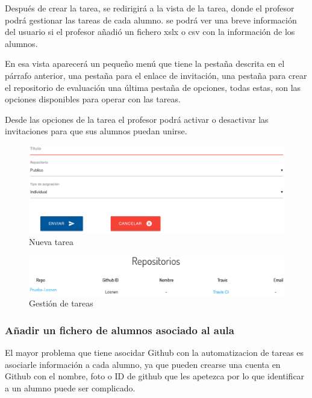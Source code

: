Después de crear la tarea, se redirigirá a la vista de la tarea, donde el profesor podrá gestionar las tareas de cada alumno. se podrá ver una breve información del usuario si el profesor añadió un fichero xslx o csv con la información de los alumnos.

En esa vista aparecerá un pequeño menú que tiene la pestaña descrita en el párrafo anterior, una pestaña para el enlace de invitación, una pestaña para crear el repositorio de evaluación una última pestaña de opciones, todas estas, son las opciones disponibles para operar con las tareas.

Desde las opciones de la tarea el profesor podrá activar o desactivar las invitaciones para que sus alumnos puedan unirse.

\begin{figure}[!th]
\begin{center}
\includegraphics[scale=0.5]{images/tarea}
\caption{Nueva tarea}
\label{fig:Nueva tarea}
\end{center}
\end{figure}

\begin{figure}[!th]
\begin{center}
\includegraphics[scale=0.5]{images/gestion}
\caption{Gestión de tareas}
\label{fig:Gestion de tareas}
\end{center}
\end{figure}

\newpage

\subsubsection{Añadir un fichero de alumnos asociado al aula}

El mayor problema que tiene asocidar Github con la automatizacion de tareas es asociarle información a cada alumno, ya que pueden crearse una cuenta en Github con el nombre, foto o ID de github que les apetezca 
por lo que identificar a un alumno puede ser complicado. 

